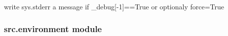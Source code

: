\documentclass[a4paper,10pt,english]{sphinxmanual}
\begin{document}

\begin{fulllineitems}
\label{\detokenize{commands/apidoc/src:src.debug.write}}
write sys.stderr a message if \_debug{[}-1{]}==True or optionaly force=True

\end{fulllineitems}



\subsubsection{src.environment module}
\label{\detokenize{commands/apidoc/src:src-environment-module}}\label{\detokenize{commands/apidoc/src:module-src.environment}}
\end{document}
